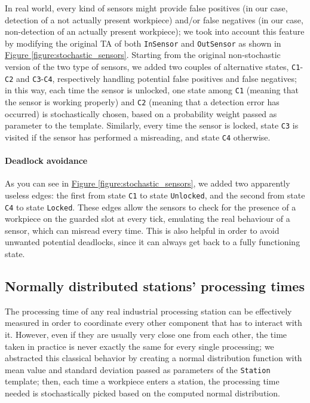 \documentclass[a4paper,twoside]{article}
\newcommand{\figureref}[1]{\textsf{\hyperref[#1]{Figure \ref*{#1}}}}
\begin{document}
    In real world, every kind of sensors might provide false positives (in our case, detection of a not actually present workpiece) and/or false negatives (in our case, non-detection of an actually present workpiece); we took into account this feature by modifying the original TA of both \texttt{InSensor} and \texttt{OutSensor} as shown in \figureref{figure:stochastic_sensors}. Starting from the original non-stochastic version of the two type of sensors, we added two couples of alternative states, \texttt{C1}-\texttt{C2} and \texttt{C3}-\texttt{C4}, respectively handling potential false positives and false negatives; in this way, each time the sensor is unlocked, one state among \texttt{C1} (meaning that the sensor is working properly) and \texttt{C2} (meaning that a detection error has occurred) is stochastically chosen, based on a probability weight passed as parameter to the template. Similarly, every time the sensor is locked, state \texttt{C3} is visited if the sensor has performed a misreading, and state \texttt{C4} otherwise.

    \paragraph{Deadlock avoidance} As you can see in \figureref{figure:stochastic_sensors}, we added two apparently useless edges: the first from state \texttt{C1} to state \texttt{Unlocked}, and the second from state \texttt{C4} to state \texttt{Locked}. These edges allow the sensors to check for the presence of a workpiece on the guarded slot at every tick, emulating the real behaviour of a sensor, which can misread every time. This is also helpful in order to avoid unwanted potential deadlocks, since it can always get back to a fully functioning state.

    \subsection{Normally distributed stations' processing times}

    The processing time of any real industrial processing station can be effectively measured in order to coordinate every other component that has to interact with it. However, even if they are usually very close one from each other, the time taken in practice is never exactly the same for every single processing; we abstracted this classical behavior by creating a normal distribution function with mean value and standard deviation passed as parameters of the \texttt{Station} template; then, each time a workpiece enters a station, the processing time needed is stochastically picked based on the computed normal distribution.
\end{document}
